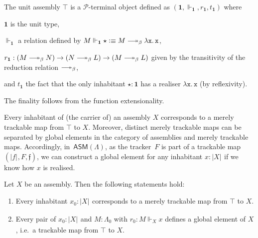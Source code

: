\documentclass[a4paper,UKenglish,numberwithinsect,cleveref,thm-restate]{lipics-v2021}
\newcommand{\tproj}[3][]{\mathopen{}\left|#3\right|_{#2}^{#1}\mathclose{}}
\newcommand{\bproj}[1]{\tproj{}{#1}}
\newcommand{\PP}{\mathscr{P}}
\newcommand{\ASM}{\mathsf{ASM}}
\newcommand{\defeq}{\vcentcolon\equiv}
\newcommand{\Unit}{\mathbf{1}}
\DeclareRobustCommand\longtwoheadrightarrow{\relbar\joinrel\twoheadrightarrow}
\newcommand{\reduce}{\longtwoheadrightarrow_{\beta}}
\theoremstyle{plain}
\begin{document}
\begin{example}
  The unit assembly $\top$ is a $\PP$-terminal object defined as $(\Unit, \Vdash_{\Unit}, r_{\Unit}, t_{\Unit})$ where 
  \begin{romanenumerate}
    \item $\Unit$ is the unit type,  
    \item $\Vdash_{\Unit}$ a relation defined by $M \Vdash_{\Unit} \star \defeq M \reduce \mathtt{\lambda x.\, x}$, 
    \item $r_{\Unit}: (M \reduce N) \to (N \reduce L) \to (M \reduce L)$ given by the transitivity of the reduction relation $\reduce$,
    \item and $t_{\Unit}$ the fact that the only inhabitant $\star : \Unit$ has a realiser $\mathtt{\lambda x.\, x}$ (by reflexivity).
  \end{romanenumerate}
  The finality follows from the function extensionality.
\end{example}

Every inhabitant of (the carrier of) an assembly $X$ corresponds to a merely trackable map from $\top$ to $X$.
Moreover, distinct merely trackable maps can be separated by global elements in the category of assemblies and merely trackable maps. 
Accordingly, in~$\ASM(\Lambda)$, as the tracker~$F$ is part of a trackable map $(\bproj{f}, F, \mathfrak{f})$, we can construct a global element for any inhabitant $x : \bproj{X}$ if we know how $x$ is realised. 
\begin{lemma}\label{lem:global-elemnt}
  Let $X$ be an assembly. Then the following statements hold:
  \begin{enumerate}
    \item Every inhabitant $x_0 : \bproj{X}$ corresponds to a merely trackable map from $\top$ to $X$.
    \item Every pair of $x_0 : \bproj{X}$ and $M : \Lambda_0$ with $r_0 : M \Vdash_X x$ defines a global element of $X$, i.e.\ a trackable map from $\top$ to $X$.
  \end{enumerate}
\end{lemma}
\end{document}
